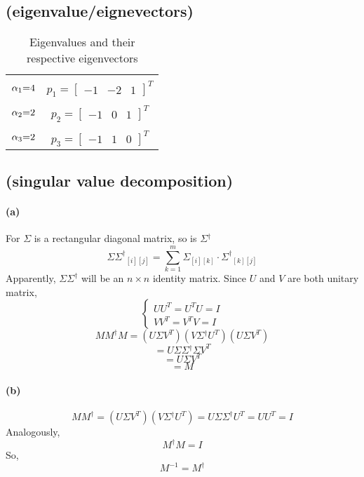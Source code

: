 \documentclass[8pt,a4paper]{exam}
\begin{document}
 \subsection{(eigenvalue/eignevectors)}
\begin{table}[htbp]
\centering
\caption{Eigenvalues and their respective eigenvectors}
 \begin{tabular}{c|c}
 	\hline\\
 	${\alpha _1}{\rm{ = }}4$ & ${p_1} = {[\begin{array}{*{20}{c}}
 		{ - 1}&{ - 2}&1
 		\end{array}]^T}$\\
 	\hline\\
 	 ${\alpha _2}{\rm{ = }}2$ & ${p_2} = {[\begin{array}{*{20}{c}}
 	 		{ - 1}&0&1
 	 		\end{array}]^T}$\\
 	\hline\\
 	${\alpha _3}{\rm{ = }}2$ & ${p_3} = {[\begin{array}{*{20}{c}}
 		{ - 1}&1&0\end{array}]^T}$\\
 	\hline
 \end{tabular}
\end{table}
\subsection{(singular value decomposition)}
\paragraph{(a)}
 	  	For $\Sigma$ is a rectangular diagonal matrix, so is ${{\Sigma }}{^\dag }$
 \[{{\Sigma }}{{{\Sigma }}^\dag }_{[i][j]} = \sum\limits_{k = 1}^m {{{{\Sigma }}_{[i][k]}} \cdot {{{\Sigma }}^\dag }_{[k][j]}} \]
\indent  	Apparently, ${{\Sigma }}{{{\Sigma }}^\dag }$ will be an $n \times n$ identity matrix. Since $U$ and $V$ are both unitary matrix,
 	\[\left\{ {\begin{array}{*{20}{c}}
 		{U{U^T} = {U^T}U = I}\\
 		{V{V^T} = {V^T}V = I}
 		\end{array}} \right.\]
 	\[M{M^\dag }M = (U{{\Sigma }}{V^T})(V{{\Sigma }}{^\dag }{U^T})(U{{\Sigma }}{V^T})\]
 	\[ = U{{\Sigma }}{{\Sigma }}{^\dag }{{\Sigma }}{V^T}\]
 	\[ = U{{\Sigma }}{V^T}\]
 	\[ = M\]
\paragraph{(b)}
   \[M{M^\dag } = (U\Sigma {V^T})(V\Sigma {^\dag }{U^T}) = U\Sigma {\Sigma ^\dag }{U^T} = U{U^T} = I\]
   Analogously,\[{M^\dag }M = I\]
   So,
   \[{M^{ - 1}} = {M^\dag }\]
\end{document}

